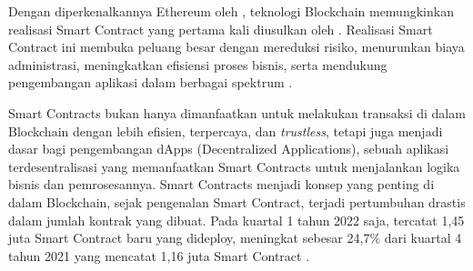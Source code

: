 
Dengan diperkenalkannya Ethereum oleh \cite{buterin2013ethereum}, teknologi Blockchain memungkinkan realisasi Smart Contract yang pertama kali diusulkan oleh \cite{szabo1997formalizing}. Realisasi Smart Contract ini membuka peluang besar dengan mereduksi risiko, menurunkan biaya administrasi, meningkatkan efisiensi proses bisnis, serta mendukung pengembangan aplikasi dalam berbagai spektrum \parencite{zheng2020overview}. 

Smart Contracts bukan hanya dimanfaatkan untuk melakukan transaksi di dalam Blockchain dengan lebih efisien, terpercaya, dan \textit{trustless}, tetapi juga menjadi dasar bagi pengembangan dApps (Decentralized Applications), sebuah aplikasi terdesentralisasi yang memanfaatkan Smart Contracts untuk menjalankan logika bisnis dan pemrosesannya. Smart Contracts menjadi konsep yang penting di dalam Blockchain, sejak pengenalan Smart Contract, terjadi pertumbuhan drastis dalam jumlah kontrak yang dibuat. Pada kuartal 1 tahun 2022 saja, tercatat 1,45 juta Smart Contract baru yang dideploy, meningkat sebesar 24,7\% dari kuartal 4 tahun 2021 yang mencatat 1,16 juta Smart Contract \parencite{alchemy_ethereum_statistics}. 

